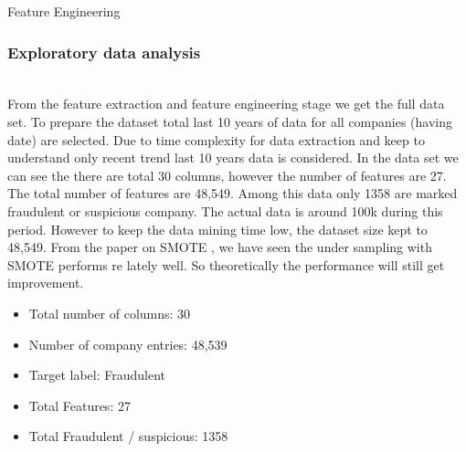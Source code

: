 \begin{algorithm}
\caption{Feature Engineering}
\label{alg:feature}

\end{algorithm}


\subsubsection{Exploratory data analysis}\hspace*{\fill} \\

From the feature extraction and feature engineering stage we get the full data set. To prepare the dataset total last 10 years of data for all companies (having  date) are selected. Due to time complexity for data extraction and keep to understand only recent trend last 10 years data is considered. In the data set we can see the there are total 30 columns, however the number of features are 27. The total number of features are 48,549. Among this data only 1358 are marked fraudulent or suspicious company. The actual data is around 100k during this period. However to keep the data mining time low, the dataset size kept to 48,549. From the paper on SMOTE \cite{}, we have seen the under sampling with SMOTE performs re lately well. So theoretically the performance will still get improvement. 
\begin{itemize}
    \item Total number of columns: 30
    \item Number of company entries: 48,539
    \item Target label: Fraudulent
    \item Total Features: 27
    \item Total Fraudulent / suspicious: 1358
\end{itemize}

